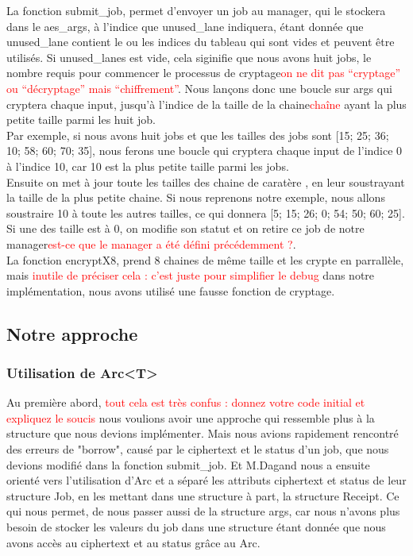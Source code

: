 \documentclass{article}
\newcommand{\TODO}[1]{\textcolor{red}{#1}}
\begin{document}
La fonction submit\_job, permet d'envoyer un job au manager, qui le stockera dans le aes\_args, à l'indice que unused\_lane indiquera, étant donnée que unused\_lane contient le ou les indices du tableau qui sont vides et peuvent être utilisés. Si unused\_lanes est vide, cela siginifie que nous avons huit jobs, le nombre requis pour commencer le processus de cryptage\TODO{on ne dit pas ``cryptage'' ou ``décryptage'' mais ``chiffrement''}.
Nous lançons donc une boucle sur args qui cryptera chaque input, jusqu'à l'indice de la taille de la chaine\TODO{chaîne} ayant la plus petite taille parmi les huit job. \\
Par exemple, si nous avons huit jobs et que les tailles des jobs sont [15; 25; 36; 10; 58; 60; 70; 35], nous ferons une boucle qui cryptera chaque input de l'indice 0 à l'indice 10, car 10 est la plus petite taille parmi les jobs. \\
Ensuite on met à jour toute les tailles des chaine de caratère , en leur soustrayant la taille de la plus petite chaine. Si nous reprenons notre exemple, nous allons soustraire 10 à toute les autres tailles, ce qui donnera [5; 15; 26; 0; 54; 50; 60; 25].\\
Si une des taille est à 0, on modifie son statut et on retire ce job de notre manager\TODO{est-ce que le manager a été défini précédemment ?}.\\
La fonction encryptX8, prend 8 chaines de même taille et les crypte en parrallèle, mais \TODO{inutile de préciser cela : c'est juste pour simplifier le debug} dans notre implémentation, nous avons utilisé une fausse fonction de cryptage. 

\subsection{Notre approche}
\subsubsection{Utilisation de Arc<T>  }

Au première abord, \TODO{tout cela est très confus : donnez votre code initial et expliquez le soucis} nous voulions avoir une approche qui ressemble plus à la structure que nous devions implémenter. Mais nous avions rapidement rencontré des erreurs de "borrow", causé par le ciphertext et le status d'un job, que nous devions modifié dans la fonction submit\_job. Et M.Dagand nous a ensuite orienté vers l'utilisation d'Arc et a séparé les attributs ciphertext et status de leur structure Job, en les mettant dans une structure à part, la structure Receipt. Ce qui nous permet, de nous passer aussi de la structure args, car nous n'avons plus besoin de stocker les valeurs du job dans une structure étant donnée que nous avons accès au ciphertext et au status grâce au Arc. 
\end{document}
